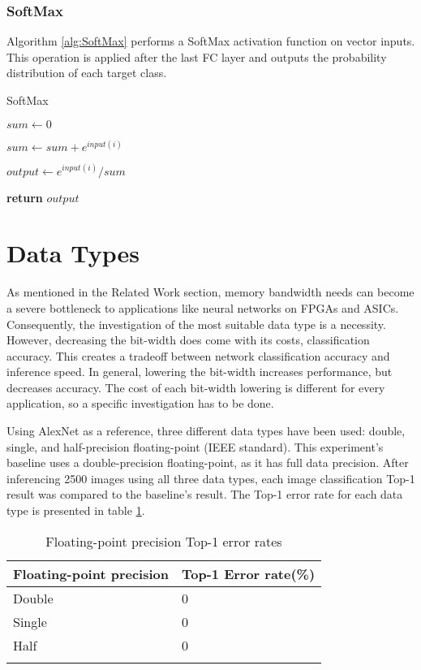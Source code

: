 \subsubsection{SoftMax}
Algorithm \ref{alg:SoftMax} performs a SoftMax activation function on vector inputs. This operation is applied after the last FC layer and outputs the probability distribution of each target class.

\begin{algorithm}[H]
	\caption{SoftMax}\label{alg:SoftMax}
	\begin{algorithmic}[1]
			\State $sum \gets 0$

				\State $sum \gets sum + e^{input(i)}$
			\EndFor

				\State $output \gets e^{input(i)} / sum$
			\EndFor

			\State \textbf{return} $output$
		\EndProcedure
	\end{algorithmic}
\end{algorithm}

\section{Data Types}
As mentioned in the Related Work section, memory bandwidth needs can become a severe bottleneck to applications like neural networks on FPGAs and ASICs. Consequently, the investigation of the most suitable data type is a necessity. However, decreasing the bit-width does come with its costs, classification accuracy. This creates a tradeoff between network classification accuracy and inference speed. In general, lowering the bit-width increases performance, but decreases accuracy. The cost of each bit-width lowering is different for every application, so a specific investigation has to be done.

Using AlexNet as a reference, three different data types have been used: double, single, and half-precision floating-point (IEEE standard). This experiment's baseline uses a double-precision floating-point, as it has full data precision. After inferencing 2500 images using all three data types, each image classification Top-1 result was compared to the baseline's result. The Top-1 error rate for each data type is presented in table \ref{tab:floats-error-rates}.

\begin{table}[H]
	\caption{Floating-point precision Top-1 error rates}
	\label{tab:floats-error-rates}
	\centering
	\begin{tabular}{l l}
		\toprule
		\textbf{Floating-point precision} & \textbf{Top-1 Error rate(\%)}  \\
		\midrule
			Double 	& 0 \\
			Single 	& 0 \\
			Half 	& 0 \\
		\bottomrule\\
	\end{tabular}
\end{table}

